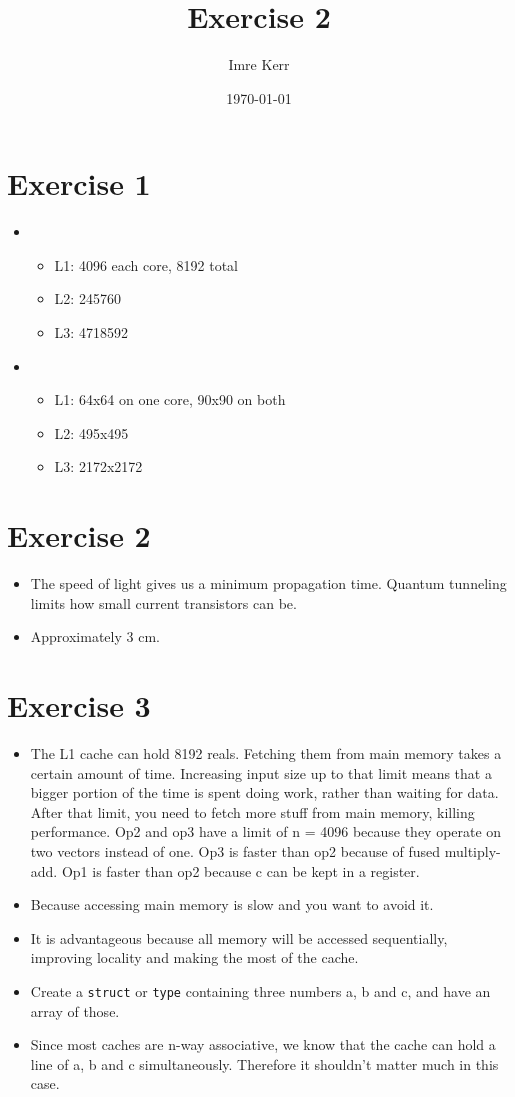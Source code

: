 \documentclass[a4paper,12pt]{article}
\author{Imre Kerr}
\title{Exercise 2}
\date{\today}
\begin{document}
\section{Exercise 1} %
\label{sec:exercise_1}
\begin{itemize}
	\item \begin{itemize}
		\item L1: 4096 each core, 8192 total
		\item L2: 245760
		\item L3: 4718592
	\end{itemize}
	\item \begin{itemize}
		\item L1: 64x64 on one core, 90x90 on both
		\item L2: 495x495
		\item L3: 2172x2172
	\end{itemize}
\end{itemize}
\section{Exercise 2} %
\label{sec:exercise_2}
\begin{itemize}
	\item The speed of light gives us a minimum propagation time. Quantum tunneling limits how small current transistors can be.
	\item Approximately 3 cm.
 \end{itemize}
\section{Exercise 3} %
\label{sec:exercise_3}
\begin{itemize}
	\item The L1 cache can hold 8192 reals. Fetching them from main memory takes a certain amount of time. Increasing input size up to that limit means that a bigger portion of the time is spent doing work, rather than waiting for data. After that limit, you need to fetch more stuff from main memory, killing performance.
	Op2 and op3 have a limit of n = 4096 because they operate on two vectors instead of one. Op3 is faster than op2 because of fused multiply-add. Op1 is faster than op2 because c can be kept in a register.
	\item Because accessing main memory is slow and you want to avoid it.
\end{itemize}
\begin{itemize}
	\item It is advantageous because all memory will be accessed sequentially, improving locality and making the most of the cache.
	\item Create a \texttt{struct} or \texttt{type} containing three numbers a, b and c, and have an array of those.
	\item Since most caches are n-way associative, we know that the cache can hold a line of a, b and c simultaneously. Therefore it shouldn't matter much in this case.
\end{itemize}
\end{document}
